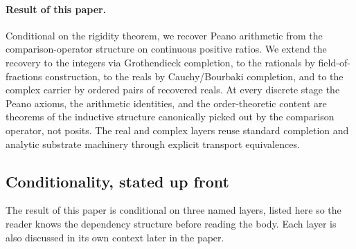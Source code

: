 \documentclass[11pt,a4paper]{article}
\theoremstyle{definition}
\theoremstyle{remark}
\begin{document}
\paragraph{Result of this paper.} Conditional on the
\cite{Washburn2026LogicFE} rigidity theorem, we recover Peano
arithmetic from the comparison-operator structure on continuous
positive ratios. We extend the recovery to the integers via
Grothendieck completion, to the rationals by field-of-fractions
construction, to the reals by Cauchy/Bourbaki completion, and to the
complex carrier by ordered pairs of recovered reals. At every
discrete stage the Peano axioms, the arithmetic identities, and the
order-theoretic content are theorems of the inductive structure
canonically picked out by the comparison operator, not posits. The
real and complex layers reuse standard completion and analytic
substrate machinery through explicit transport equivalences.

\subsection{Conditionality, stated up front}
\label{subsec:conditionality}

The result of this paper is conditional on three named layers,
listed here so the reader knows the dependency structure before
reading the body. Each layer is also discussed in its own context
later in the paper.
\end{document}

